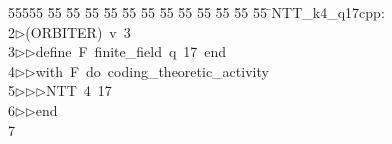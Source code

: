 %
%
\begin{tabbing}
55555 \= 55 \= 55 \= 55 \= 55 \= 55 \= 55 \= 55 \= 55 \= 55 \= 55 \= 55 \= 55 \= \>NTT\_k4\_q17cpp:\\[0pt]
2\>$\triangleright$\>(ORBITER)\ v\ 3\ \\[0pt]
3\>$\triangleright$\>$\triangleright$\>define\ F\ finite\_field\ q\ 17\ end\ \\[0pt]
4\>$\triangleright$\>$\triangleright$\>with\ F\ do\ coding\_theoretic\_activity\ \\[0pt]
5\>$\triangleright$\>$\triangleright$\>$\triangleright$\>NTT\ 4\ 17\ \\[0pt]
6\>$\triangleright$\>$\triangleright$\>end\\[0pt]
7\>\end{tabbing}
